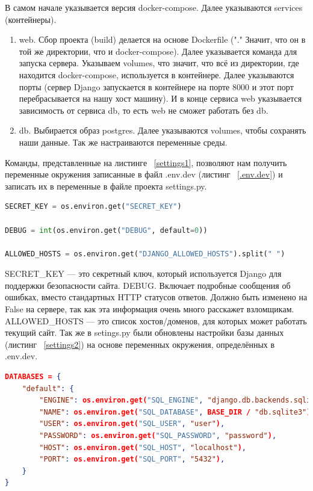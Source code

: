 	В самом начале указывается версия \textsf{docker-compose}. Далее указываются \textsf{services} (контейнеры). 
\begin{enumerate}
	\item \textsf{web}. Сбор проекта (\textsf{build}) делается на основе \textsf{Dockerfile} ("\textsf{.}" Значит, что он в той же директории, что и \textsf{docker-compose}). Далее указывается команда для запуска сервера. Указываем \textsf{volumes}, что значит, что всё из директории, где находится \textsf{docker-compose}, используется в контейнере. Далее указываются порты (сервер \textsf{Django} запускается в контейнере на порте \textsf{8000} и этот порт перебрасывается на нашу хост машину). И в конце сервиса \textsf{web} указывается зависимость от сервиса \textsf{db}, то есть \textsf{web} не сможет работать без \textsf{db}.
	\item \textsf{db}. Выбирается образ \textsf{postgres}. Далее указываются volumes, чтобы сохранять наши данные. Так же настраиваются переменные среды.
\end{enumerate}
	Команды, представленные на листинге ~\ref{settings1}, позволяют нам получить переменные окружения записанные в файл \textsf{.env.dev} (листинг ~\ref{.env.dev}) и записать их в переменные в файле проекта \textsf{settings.py}.

\begin{lstlisting}[frame=single, label={settings1}, caption={Обновлённые переменные в \textsf{settings.py}}, language=Python] 
SECRET_KEY = os.environ.get("SECRET_KEY")

DEBUG = int(os.environ.get("DEBUG", default=0))

ALLOWED_HOSTS = os.environ.get("DJANGO_ALLOWED_HOSTS").split(" ")
\end{lstlisting}

	\textsf{SECRET_KEY} — это секретный ключ, который используется Django для поддержки безопасности сайта.
	\textsf{DEBUG}. Включает подробные сообщения об ошибках, вместо стандартных \textsf{HTTP} статусов ответов. Должно быть изменено на \textsf{False} на сервере, так как эта информация очень много расскажет взломщикам.
	\textsf{ALLOWED_HOSTS} — это список хостов/доменов, для которых может работать текущий сайт.
	Так же в \textsf{setings.py} были обновлены настройки базы данных (листинг ~\ref{settings2}) на основе переменных окружения, определённых в \textsf{.env.dev}.

\begin{lstlisting}[frame=single, label={settings2}, caption={Обновлённые переменные в \textsf{settings.py}}, language={json}] 
DATABASES = {
    "default": {
        "ENGINE": os.environ.get("SQL_ENGINE", "django.db.backends.sqlite3"),
        "NAME": os.environ.get("SQL_DATABASE", BASE_DIR / "db.sqlite3"),
        "USER": os.environ.get("SQL_USER", "user"),
        "PASSWORD": os.environ.get("SQL_PASSWORD", "password"),
        "HOST": os.environ.get("SQL_HOST", "localhost"),
        "PORT": os.environ.get("SQL_PORT", "5432"),
    }
}
\end{lstlisting}

